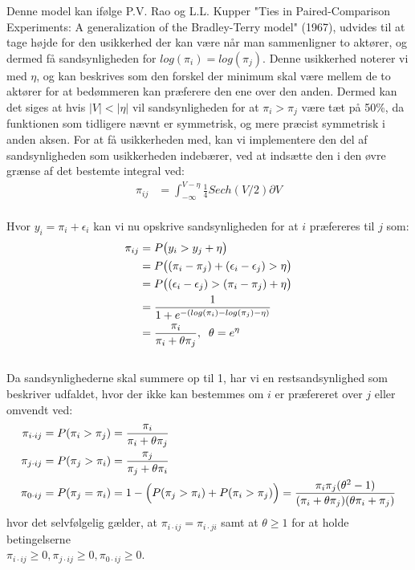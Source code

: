 \documentclass[11pt,a4paper]{article}
\begin{document}
Denne model kan ifølge P.V. Rao og L.L. Kupper "Ties in Paired-Comparison Experiments: A generalization of the Bradley-Terry model" (1967), udvides til at tage højde for den usikkerhed der kan være når man sammenligner to aktører, og dermed få sandsynligheden for $log(\pi_i)=log(\pi_j)$. Denne usikkerhed noterer vi med $\eta$, og kan beskrives som den forskel der minimum skal være mellem de to aktører for at bedømmeren kan præferere den ene over den anden. Dermed kan det siges at hvis $|V| < |\eta|$ vil sandsynligheden for at $\pi_i > \pi_j$ være tæt på 50\%, da funktionen som tidligere nævnt er symmetrisk, og mere præcist symmetrisk i anden aksen. For at få usikkerheden med, kan vi implementere den del af sandsynligheden som usikkerheden indebærer, ved at indsætte den i den øvre grænse af det bestemte integral ved:\\  
\begin{align*}
\pi_{ij} &= \int_{-\infty}^{V-\eta} \frac{1}{4}Sech(V/2) \partial V
\end{align*}
\\
Hvor $y_i=\pi_i+\epsilon_i$ kan vi nu opskrive sandsynligheden for at $i$ præfereres til $j$ som:
\begin{align*}
\pi_{ij}&=P\big{(}y_i>y_j+\eta\big{)}
\\&=P\big{(}(\pi_i-\pi_j)+(\epsilon_i-\epsilon_j)>\eta\big{)}
\\&=P\big{(}(\epsilon_i-\epsilon_j)>(\pi_i-\pi_j)+\eta\big{)}
\\&=\frac{1}{1+e^{-(log(\pi_i)-log(\pi_j)-\eta)}} 
\\&=\frac{\pi_i}{\pi_i+\theta \pi_j},\;\;\theta = e^\eta
\end{align*}
\\
Da sandsynlighederne skal summere op til 1, har vi en restsandsynlighed som beskriver udfaldet, hvor der ikke kan bestemmes om $i$ er præfereret over $j$ eller omvendt ved:
\begin{align*}
\pi_{i\cdot ij} &= P(\pi_i > \pi_j) = \frac{\pi_i}{\pi_i+\theta \pi_j}\\
\pi_{j\cdot ij} &= P(\pi_j > \pi_i) = \frac{\pi_j}{\pi_j+\theta \pi_i}\\
\pi_{0\cdot ij} &= P(\pi_j = \pi_i) = 1 - \Big{(}P(\pi_j > \pi_i) + P(\pi_i > \pi_j)\Big{)}= \frac{\pi_i \pi_j(\theta^2 -1)}{(\pi_i+\theta \pi_j)(\theta \pi_i + \pi_j)} 
\end{align*}
hvor det selvfølgelig gælder, at $\pi_{i\cdot ij}=\pi_{i\cdot ji}$ samt at $\theta\geq1$ for at holde betingelserne \\
$\pi_{i\cdot ij}\geq0,\pi_{j\cdot ij}\geq0,\pi_{0\cdot ij}\geq0$. 
\\
\end{document}
